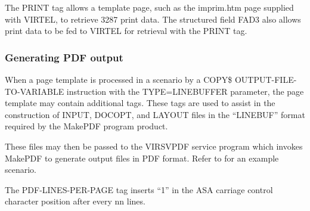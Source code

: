 \documentclass[letterpaper,10pt,english]{sphinxmanual}
\begin{document}

\begin{sphinxVerbatim}[commandchars=\\\{\}]
   
\end{sphinxVerbatim}

The PRINT tag allows a template page, such as the imprim.htm page supplied with VIRTEL, to retrieve 3287 print data. The structured field FAD3 also allows print data to be fed to VIRTEL for retrieval with the PRINT tag.


\subsubsection{Generating PDF output}
\label{\detokenize{User_Guide:generating-pdf-output}}\label{\detokenize{User_Guide:v457ug-pdf-output}}

When a page template is processed in a scenario by a COPY\$ OUTPUT-FILE-TO-VARIABLE instruction with the TYPE=LINEBUFFER parameter, the page template may contain additional tags. These tags are used to assist in the construction of INPUT, DOCOPT, and LAYOUT files in the “LINEBUF” format required by the MakePDF program product.

These files may then be passed to the VIRSVPDF service program which invokes MakePDF to generate output files in PDF format. Refer to {\hyperref[\detokenize{User_Guide:v457ug-pdf}]{}} for an example scenario.


\begin{sphinxVerbatim}[commandchars=\\\{\}]
  
\end{sphinxVerbatim}

The PDF-LINES-PER-PAGE tag inserts “1” in the ASA carriage control character position after every nn lines.

\end{document}
